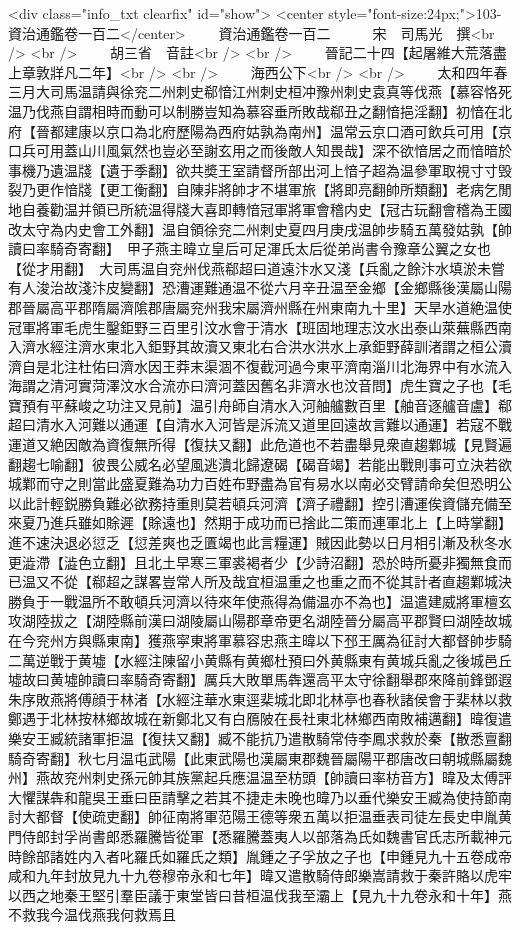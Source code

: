 <div class="info_txt clearfix" id="show">
<center style="font-size:24px;">103-資治通鑑卷一百二</center>
  　　資治通鑑卷一百二　　　宋　司馬光　撰<br />
<br />
　　胡三省　音註<br />
<br />
　　晉記二十四【起屠維大荒落盡上章敦牂凡二年】<br />
<br />
　　海西公下<br />
<br />
　　太和四年春三月大司馬温請與徐兖二州刺史郗愔江州刺史桓冲豫州刺史袁真等伐燕【慕容恪死温乃伐燕自謂相時而動可以制勝豈知為慕容垂所敗哉郗丑之翻愔挹淫翻】初愔在北府【晉都建康以京口為北府歷陽為西府姑孰為南州】温常云京口酒可飲兵可用【京口兵可用蓋山川風氣然也豈必至謝玄用之而後敵人知畏哉】深不欲愔居之而愔暗於事機乃遺温牋【遺于季翻】欲共奬王室請督所部出河上愔子超為温參軍取視寸寸毁裂乃更作愔牋【更工衡翻】自陳非將帥才不堪軍旅【將即亮翻帥所類翻】老病乞閒地自養勸温并領已所統温得牋大喜即轉愔冠軍將軍會稽内史【冠古玩翻會稽為王國改太守為内史會工外翻】温自領徐兖二州刺史夏四月庚戌温帥步騎五萬發姑孰【帥讀曰率騎奇寄翻】　甲子燕主暐立皇后可足渾氏太后從弟尚書令豫章公翼之女也【從才用翻】　大司馬温自兖州伐燕郗超曰道遠汴水又淺【兵亂之餘汴水填淤未嘗有人浚治故淺汴皮變翻】恐漕運難通温不從六月辛丑温至金鄉【金鄉縣後漢屬山陽郡晉屬高平郡隋屬濟隂郡唐屬兖州我宋屬濟州縣在州東南九十里】天旱水道絶温使冠軍將軍毛虎生鑿鉅野三百里引汶水會于清水【班固地理志汶水出泰山萊蕪縣西南入濟水經注濟水東北入鉅野其故瀆又東北右合洪水洪水上承鉅野薛訓渚謂之桓公瀆濟自是北注杜佑曰濟水因王莽末渠涸不復截河過今東平濟南淄川北海界中有水流入海謂之清河實菏澤汶水合流亦曰濟河蓋因舊名非濟水也汶音問】虎生寶之子也【毛寶預有平蘇峻之功注又見前】温引舟師自清水入河舳艫數百里【舳音逐艫音盧】郗超曰清水入河難以通運【自清水入河皆是泝流又道里回遠故言難以通運】若寇不戰運道又絶因敵為資復無所得【復扶又翻】此危道也不若盡舉見衆直趨鄴城【見賢遍翻趨七喻翻】彼畏公威名必望風逃潰北歸遼碣【碣音竭】若能出戰則事可立決若欲城鄴而守之則當此盛夏難為功力百姓布野盡為官有易水以南必交臂請命矣但恐明公以此計輕鋭勝負難必欲務持重則莫若頓兵河濟【濟子禮翻】控引漕運俟資儲充備至來夏乃進兵雖如賖遲【賖遠也】然期于成功而已捨此二策而連軍北上【上時掌翻】進不速決退必愆乏【愆差爽也乏匱竭也此言糧運】賊因此勢以日月相引漸及秋冬水更澁滯【澁色立翻】且北土早寒三軍裘褐者少【少詩沼翻】恐於時所憂非獨無食而已温又不從【郗超之謀畧豈常人所及哉宜桓温重之也重之而不從其計者直趨鄴城決勝負于一戰温所不敢頓兵河濟以待來年使燕得為備温亦不為也】温遣建威將軍檀玄攻湖陸拔之【湖陸縣前漢曰湖陵屬山陽郡章帝更名湖陸晉分屬高平郡賢曰湖陸故城在今兖州方與縣東南】獲燕寜東將軍慕容忠燕主暐以下邳王厲為征討大都督帥步騎二萬逆戰于黄墟【水經注陳留小黄縣有黄鄉杜預曰外黄縣東有黄城兵亂之後城邑丘墟故曰黄墟帥讀曰率騎奇寄翻】厲兵大敗單馬犇還高平太守徐翻舉郡來降前鋒鄧遐朱序敗燕將傅顔于林渚【水經注華水東逕棐城北即北林亭也春秋諸侯會于棐林以救鄭遇于北林按林鄉故城在新鄭北又有白鴈陂在長社東北林鄉西南敗補邁翻】暐復遣樂安王臧統諸軍拒温【復扶又翻】臧不能抗乃遣散騎常侍李鳳求救於秦【散悉亶翻騎奇寄翻】秋七月温屯武陽【此東武陽也漢屬東郡魏晉屬陽平郡唐改曰朝城縣屬魏州】燕故兖州刺史孫元帥其族黨起兵應温温至枋頭【帥讀曰率枋音方】暐及太傅評大懼謀犇和龍吳王垂曰臣請擊之若其不捷走未晚也暐乃以垂代樂安王臧為使持節南討大都督【使疏吏翻】帥征南將軍范陽王德等衆五萬以拒温垂表司徒左長史申胤黄門侍郎封孚尚書郎悉羅騰皆從軍【悉羅騰蓋夷人以部落為氏如魏書官氏志所載神元時餘部諸姓内入者叱羅氏如羅氏之類】胤鍾之子孚放之子也【申鍾見九十五卷成帝咸和九年封放見九十九卷穆帝永和七年】暐又遣散騎侍郎樂嵩請救于秦許賂以虎牢以西之地秦王堅引羣臣議于東堂皆曰昔桓温伐我至灞上【見九十九卷永和十年】燕不救我今温伐燕我何救焉且